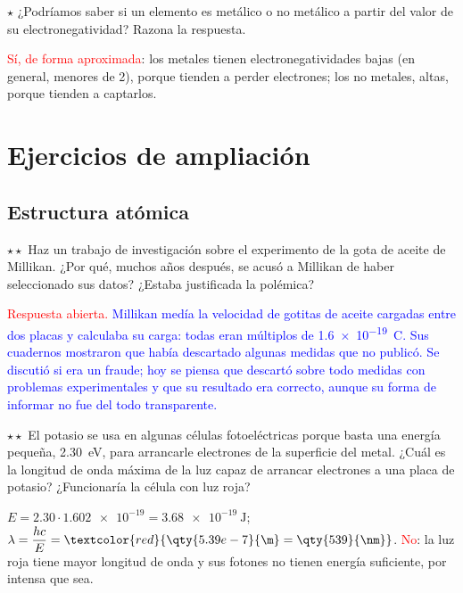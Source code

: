 \begin{exercise}
    \(\star\) ¿Podríamos saber si un elemento es metálico o no metálico a partir del valor de su electronegatividad? Razona la
    respuesta.
    \begin{solu}
        \textcolor{red}{Sí, de forma aproximada}: los metales tienen electronegatividades bajas (en general, menores de 2), porque
        tienden a perder electrones; los no metales, altas, porque tienden a captarlos.
    \end{solu}
\end{exercise}

\section{Ejercicios de ampliación}\label{sec:ud3-ampliacion}

\subsection{Estructura atómica}

\begin{exercise}
    \(\star\star\) Haz un trabajo de investigación sobre el experimento de la gota de aceite de Millikan. ¿Por qué, muchos años
    después, se acusó a Millikan de haber seleccionado sus datos? ¿Estaba justificada la polémica?
    \begin{solu}
        \textcolor{red}{Respuesta abierta.} \textcolor{blue}{Millikan medía la velocidad de gotitas de aceite cargadas entre dos
        placas y calculaba su carga: todas eran múltiplos de \qty{1.6e-19}{\coulomb}. Sus cuadernos mostraron que había descartado
        algunas medidas que no publicó. Se discutió si era un fraude; hoy se piensa que descartó sobre todo medidas con problemas
        experimentales y que su resultado era correcto, aunque su forma de informar no fue del todo transparente.}
    \end{solu}
\end{exercise}

\begin{exercise}
    \(\star\star\) El potasio se usa en algunas células fotoeléctricas porque basta una energía pequeña, \qty{2.30}{\electronvolt},
    para arrancarle electrones de la superficie del metal. ¿Cuál es la longitud de onda máxima de la luz capaz de arrancar
    electrones a una placa de potasio? ¿Funcionaría la célula con luz roja?
    \begin{solu}
        \(E = \num{2.30} \cdot \num{1.602e-19} = \qty{3.68e-19}{\joule}\); \(\lambda = \dfrac{hc}{E} = \textcolor{red}{\qty{5.39e-7}{\m}
        = \qty{539}{\nm}}\). \textcolor{red}{No}: la luz roja tiene mayor longitud de onda y sus fotones no tienen energía suficiente,
        por intensa que sea.
    \end{solu}
\end{exercise}

